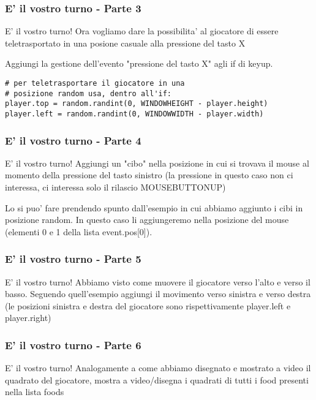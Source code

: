 \documentclass{beamer}
\begin{document}
\begin{frame}[fragile]
\frametitle{E' il vostro turno - Parte 3}
\begin{block}{E' il vostro turno!}
    Ora vogliamo dare la possibilita' al giocatore di essere teletrasportato in una posione casuale alla pressione del tasto X
    
    Aggiungi la gestione dell'evento "pressione del tasto X" agli if di keyup.
    
    \begin{lstlisting}
# per teletrasportare il giocatore in una
# posizione random usa, dentro all'if:
player.top = random.randint(0, WINDOWHEIGHT - player.height)
player.left = random.randint(0, WINDOWWIDTH - player.width)
    \end{lstlisting}
\end{block}

\end{frame}

\begin{frame}[fragile]
\frametitle{E' il vostro turno - Parte 4}
\begin{block}{E' il vostro turno!}
    Aggiungi un "cibo" nella posizione in cui si trovava il mouse al momento della pressione del tasto sinistro (la pressione in questo caso non ci interessa, ci interessa solo il rilascio MOUSEBUTTONUP)
        
    Lo si puo' fare prendendo spunto dall'esempio in cui abbiamo aggiunto i cibi in posizione random. In questo caso li aggiungeremo nella posizione del mouse (elementi 0 e 1 della lista event.pos[0]).
\end{block}

\end{frame}

\begin{frame}[fragile]
\frametitle{E' il vostro turno - Parte 5}
\begin{block}{E' il vostro turno!}
Abbiamo visto come muovere il giocatore verso l'alto e verso il basso. Seguendo quell'esempio aggiungi il movimento verso sinistra e verso destra (le posizioni sinistra e destra del giocatore sono rispettivamente player.left e player.right) 
\end{block}

\end{frame}

\begin{frame}[fragile]
\frametitle{E' il vostro turno - Parte 6}
\begin{block}{E' il vostro turno!}
Analogamente a come abbiamo disegnato e mostrato a video il quadrato del giocatore, mostra a video/disegna i quadrati di tutti i food presenti nella lista foods
\end{block}

\end{frame}
\end{document}
